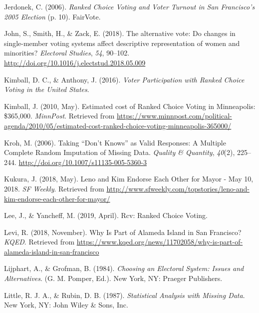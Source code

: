 \documentclass[12pt,twoside]{reedthesis}
\begin{document}
\leavevmode\hypertarget{ref-jerdonek_ranked_2006}{}%
Jerdonek, C. (2006). \emph{Ranked Choice Voting and Voter Turnout in San Francisco's 2005 Election} (p. 10). FairVote.

\leavevmode\hypertarget{ref-john_alternative_2018}{}%
John, S., Smith, H., \& Zack, E. (2018). The alternative vote: Do changes in single-member voting systems affect descriptive representation of women and minorities? \emph{Electoral Studies}, \emph{54}, 90--102. \url{http://doi.org/10.1016/j.electstud.2018.05.009}

\leavevmode\hypertarget{ref-kimball_voter_2016}{}%
Kimball, D. C., \& Anthony, J. (2016). \emph{Voter Participation with Ranked Choice Voting in the United States}.

\leavevmode\hypertarget{ref-kimball_estimated_2010}{}%
Kimball, J. (2010, May). Estimated cost of Ranked Choice Voting in Minneapolis: \$365,000. \emph{MinnPost}. Retrieved from \url{https://www.minnpost.com/political-agenda/2010/05/estimated-cost-ranked-choice-voting-minneapolis-365000/}

\leavevmode\hypertarget{ref-kroh_taking_2006}{}%
Kroh, M. (2006). Taking ``Don't Knows'' as Valid Responses: A Multiple Complete Random Imputation of Missing Data. \emph{Quality \& Quantity}, \emph{40}(2), 225--244. \url{http://doi.org/10.1007/s11135-005-5360-3}

\leavevmode\hypertarget{ref-kukura_leno_2018}{}%
Kukura, J. (2018, May). Leno and Kim Endorse Each Other for Mayor - May 10, 2018. \emph{SF Weekly}. Retrieved from \url{http://www.sfweekly.com/topstories/leno-and-kim-endorse-each-other-for-mayor/}

\leavevmode\hypertarget{ref-lee_rcv_2019}{}%
Lee, J., \& Yancheff, M. (2019, April). Rcv: Ranked Choice Voting.

\leavevmode\hypertarget{ref-levi_why_2018}{}%
Levi, R. (2018, November). Why Is Part of Alameda Island in San Francisco? \emph{KQED}. Retrieved from \url{https://www.kqed.org/news/11702058/why-is-part-of-alameda-island-in-san-francisco}

\leavevmode\hypertarget{ref-lijphart_choosing_1984}{}%
Lijphart, A., \& Grofman, B. (1984). \emph{Choosing an Electoral System: Issues and Alternatives}. (G. M. Pomper, Ed.). New York, NY: Praeger Publishers.

\leavevmode\hypertarget{ref-little_statistical_1987}{}%
Little, R. J. A., \& Rubin, D. B. (1987). \emph{Statistical Analysis with Missing Data}. New York, NY: John Wiley \& Sons, Inc.
\end{document}
